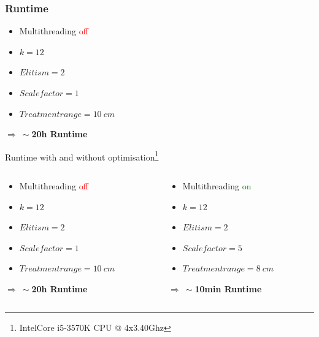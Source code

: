 \documentclass{beamer}
\begin{document}
\begin{frame}
\frametitle{Runtime}

\begin{itemize}
\item Multithreading \textcolor{red}{off}
\item $k = 12$
\item $Elitism = 2$
\item $Scalefactor = 1$
\item $Treatmentrange = 10 \ cm$
\end{itemize}

 \textbf{$\Rightarrow \ \sim $20h Runtime} 
 


\end{frame}

\begin{frame}

Runtime with and without optimisation\footnote{Intel\textregistered  Core i5-3570K CPU @ 4x3.40Ghz}
\begin{columns}[T] %
\begin{column}{.48\textwidth}
\begin{itemize}
\item Multithreading \textcolor{red}{off}
\item $k = 12$
\item $Elitism = 2$
\item $Scalefactor = 1$
\item $Treatmentrange = 10 \ cm$
\end{itemize}

 \textbf{$\Rightarrow \ \sim $20h Runtime}
\end{column}%
\hfill%

\begin{column}{.48\textwidth}
\begin{itemize}
\item Multithreading \textcolor{green}{on}
\item $k = 12$
\item $Elitism = 2$
\item $Scalefactor = 5$
\item $Treatmentrange = 8 \ cm$
\end{itemize}

 \textbf{$\Rightarrow \ \sim $10min Runtime}
\end{column}%
\end{columns}
\end{frame}
 
\end{document}
